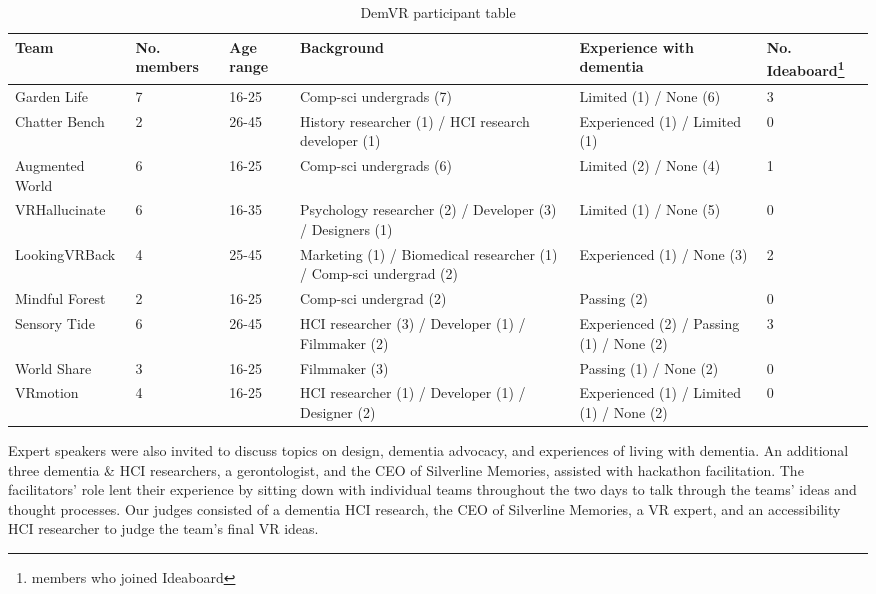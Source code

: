 \begin{table}[htp]
\begin{tabularx}{\textwidth}{@{} YYYYYY @{}}
\hline
\textbf{Team} & \textbf{No. members} & \textbf{Age range} & \textbf{Background} & \textbf{Experience with dementia} & \textbf{No. Ideaboard\footnote{members who joined Ideaboard}} \\ \hline 
Garden Life & 7 & 16-25 & Comp-sci undergrads (7) & Limited (1) / None (6) & 3 \\ \hline
Chatter Bench & 2 & 26-45 & History researcher (1) / HCI research developer   (1) & Experienced (1) / Limited (1) & 0 \\ \hline
Augmented World & 6 & 16-25 & Comp-sci undergrads (6) & Limited (2) / None (4) & 1 \\ \hline
VRHallucinate & 6 & 16-35 & Psychology researcher (2) / Developer (3) /   Designers (1) & Limited (1) / None (5) & 0 \\ \hline
LookingVRBack & 4 & 25-45 & Marketing (1) / Biomedical researcher (1) /   Comp-sci undergrad (2) & Experienced (1) / None (3) & 2 \\ \hline
Mindful Forest & 2 & 16-25 & Comp-sci undergrad (2) & Passing (2) & 0 \\ \hline
Sensory Tide & 6 & 26-45 & HCI researcher (3) / Developer (1) / Filmmaker   (2) & Experienced (2) / Passing (1) / None (2) & 3 \\ \hline
World Share & 3 & 16-25 & Filmmaker (3) & Passing (1) / None (2) & 0 \\ \hline
VRmotion & 4 & 16-25 & HCI researcher (1) / Developer (1) / Designer   (2) & Experienced (1) / Limited (1) / None (2) & 0 \\ \hline
\end{tabularx}
\caption{DemVR participant table}
\label{table:DemVRDemographic}
\end{table}

Expert speakers were also invited to discuss topics on design, dementia advocacy, and experiences of living with dementia. An additional three dementia \& HCI researchers, a gerontologist, and the CEO of Silverline Memories, assisted with hackathon facilitation. The facilitators' role lent their experience by sitting down with individual teams throughout the two days to talk through the teams' ideas and thought processes. Our judges consisted of a dementia HCI research, the CEO of Silverline Memories, a VR expert, and an accessibility HCI researcher to judge the team's final VR ideas.

\pagebreak
